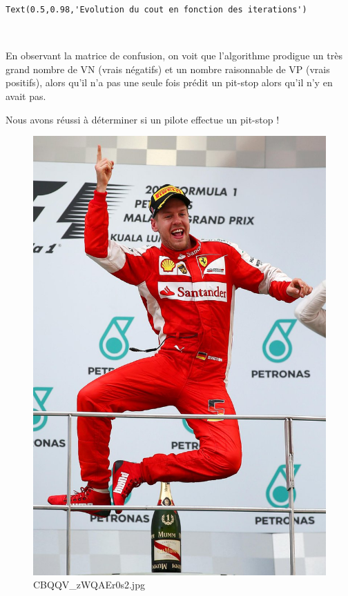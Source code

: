 \documentclass[11pt]{article}
\makeatletter
\newcommand{\boxspacing}{\kern\kvtcb@left@rule\kern\kvtcb@boxsep}
\newcommand{\prompt}[4]{
        \ttfamily\llap{{\color{#2}[#3]:\hspace{3pt}#4}}\vspace{-\baselineskip}
    }
\makeatother
\begin{document}
            \begin{tcolorbox}[breakable, size=fbox, boxrule=.5pt, pad at break*=1mm, opacityfill=0]
\prompt{Out}{outcolor}{594}{\boxspacing}
\begin{Verbatim}[commandchars=\\\{\}]
Text(0.5,0.98,'Evolution du cout en fonction des iterations')
\end{Verbatim}
\end{tcolorbox}
        
    \begin{center}
    \end{center}
    { \hspace*{\fill} \\}
    
    En observant la matrice de confusion, on voit que l'algorithme prodigue
un très grand nombre de VN (vrais négatifs) et un nombre raisonnable de
VP (vrais positifs), alors qu'il n'a pas une seule fois prédit un
pit-stop alors qu'il n'y en avait pas.

Nous avons réussi à déterminer si un pilote effectue un pit-stop !

\begin{figure}
\centering
\includegraphics{vettel_dance.jpg}
\caption{CBQQV\_zWQAEr0s2.jpg}
\end{figure}




    
    
    
\end{document}
